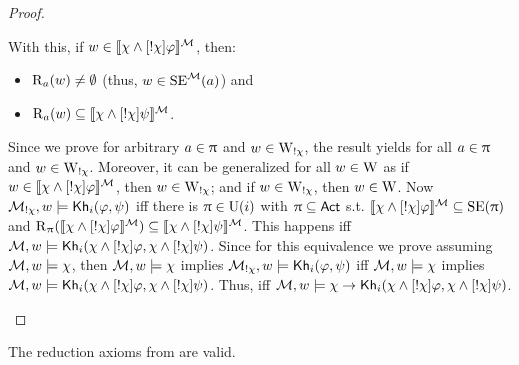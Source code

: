 \begin{proof}
\begin{itemize}
With this, if $w \in \llbracket \chi \wedge [!\chi]\varphi \rrbracket^{\mathcal{M}}$, then:
\begin{itemize}
    \item $\operatorname{R}_a(w) \neq \emptyset$ (thus, $w \in \operatorname{SE}^{\mathcal{M}}(a)$) and
    \item $\operatorname{R}_a(w) \subseteq \llbracket \chi \wedge [!\chi]\psi \rrbracket^{\mathcal{M}}$.
\end{itemize}
Since we prove for arbitrary $a \in \uppi$ and $w \in \operatorname{W}_{!\chi}$, the result yields for all $a \in \uppi$ and $w \in \operatorname{W}_{!\chi}$.
Moreover, it can be generalized for all $w \in \operatorname{W}$ as if $w \in \llbracket \chi \wedge [!\chi]\varphi \rrbracket^{\mathcal{M}}$, then $w \in \operatorname{W}_{!\chi}$; and if $w \in \operatorname{W}_{!\chi}$, then $w \in \operatorname{W}$.
Now $\mathcal{M}_{!\chi},w \models {\sf Kh}_i(\varphi,\psi)$ iff there is $\uppi \in \operatorname{U}(i)$ with $\uppi \subseteq {\rm \sf Act}$ s.t. $\llbracket \chi \wedge [!\chi]\varphi \rrbracket^{\mathcal{M}} \subseteq \operatorname{SE}(\uppi)$ and $\operatorname{R}_\uppi(\llbracket \chi \wedge [!\chi]\varphi \rrbracket^{\mathcal{M}}) \subseteq \llbracket \chi \wedge [!\chi]\psi \rrbracket^{\mathcal{M}}$.
This happens iff $\mathcal{M},w \models {\sf Kh}_i(\chi \wedge [!\chi]\varphi,\chi \wedge [!\chi]\psi)$. Since for this equivalence we prove assuming $\mathcal{M},w \models \chi$, then $\mathcal{M},w \models \chi$ implies $\mathcal{M}_{!\chi},w \models {\sf Kh}_i(\varphi,\psi)$ iff $\mathcal{M},w \models \chi$ implies $\mathcal{M},w \models {\sf Kh}_i(\chi \wedge [!\chi]\varphi,\chi \wedge [!\chi]\psi)$. Thus, iff $\mathcal{M},w \models \chi \rightarrow {\sf Kh}_i(\chi \wedge [!\chi]\varphi,\chi \wedge [!\chi]\psi)$.
\end{itemize}
\end{proof}




\begin{lemma}
The reduction axioms from  are valid.
\end{lemma}

